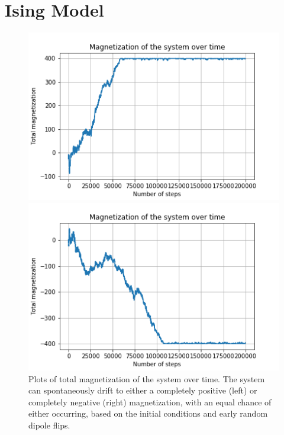 \documentclass{article}
\begin{document}
\section{Ising Model}

\begin{figure}[H]
	\begin{minipage}{0.49\linewidth}
		\includegraphics[width=\linewidth]{../images/q2_magnetization_pos.png}
	\end{minipage}
	\begin{minipage}{0.49\linewidth}
		\includegraphics[width=\linewidth]{../images/q2_magnetization_neg.png}
	\end{minipage}
	\caption{Plots of total magnetization of the system over time. The system can spontaneously drift to either a completely positive (left) or completely negative (right) magnetization, with an equal chance of either occurring, based on the initial conditions and early random dipole flips.}
	\label{fig:q2_magnetization}
\end{figure}
\end{document}
